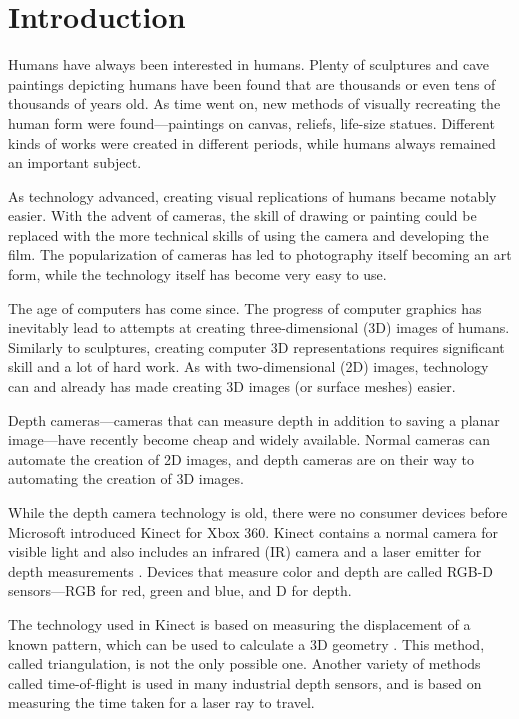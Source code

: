 \chapter{Introduction}

Humans have always been interested in humans. Plenty of sculptures and cave paintings depicting humans have been found that are thousands or even tens of thousands of years old. As time went on, new methods of visually recreating the human form were found---paintings on canvas, reliefs, life-size statues. Different kinds of works were created in different periods, while humans always remained an important subject.

As technology advanced, creating visual replications of humans became notably easier. With the advent of cameras, the skill of drawing or painting could be replaced with the more technical skills of using the camera and developing the film. The popularization of cameras has led to photography itself becoming an art form, while the technology itself has become very easy to use.

The age of computers has come since. The progress of computer graphics has inevitably lead to attempts at creating three-dimensional (3D) images of humans. Similarly to sculptures, creating computer 3D representations requires significant skill and a lot of hard work. As with two-dimensional (2D) images, technology can and already has made creating 3D images (or surface meshes) easier.

Depth cameras---cameras that can measure depth in addition to saving a planar image---have recently become cheap and widely available. Normal cameras can automate the creation of 2D images, and depth cameras are on their way to automating the creation of 3D images.

While the depth camera technology is old, there were no consumer devices before Microsoft introduced Kinect for Xbox 360. Kinect contains a normal camera for visible light and also includes an infrared (IR) camera and a laser emitter for depth measurements \citep{fisher2010}. Devices that measure color and depth are called RGB-D sensors---RGB for red, green and blue, and D for depth.

The technology used in Kinect is based on measuring the displacement of a known pattern, which can be used to calculate a 3D geometry \citep{reichinger2011}. This method, called triangulation, is not the only possible one. Another variety of methods called time-of-flight is used in many industrial depth sensors, and is based on measuring the time taken for a laser ray to travel.

